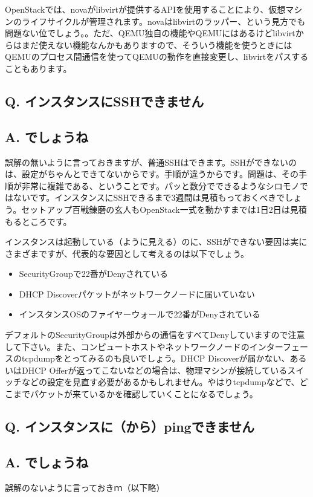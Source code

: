 \documentclass[9pt,b5paper,tombo,openany]{jsbook}
\begin{document}
OpenStackでは、novaがlibvirtが提供するAPIを使用することにより、仮想マシンのライフサイクルが管理されます。novaはlibvirtのラッパー、という見方でも問題ない位でしょう。。ただ、QEMU独自の機能やQEMUにはあるけどlibvirtからはまだ使えない機能なんかもありますので、そういう機能を使うときにはQEMUのプロセス間通信を使ってQEMUの動作を直接変更し、libvirtをパスすることもあります。

\subsection*{{\bfseries Q.} インスタンスにSSHできません}
\subsection*{{\bfseries A.} でしょうね}
誤解の無いように言っておきますが、普通SSHはできます。SSHができないのは、設定がちゃんとできてないからです。手順が違うからです。問題は、その手順が非常に複雑である、ということです。パッと数分でできるようなシロモノではないです。インスタンスにSSHできるまで3週間は見積もっておくべきでしょう。セットアップ百戦錬磨の玄人もOpenStack一式を動かすまでは1日2日は見積もるところです。

インスタンスは起動している（ように見える）のに、SSHができない要因は実にさまざまですが、代表的な要因として考えるのは以下でしょう。
\begin{itemize}
	\item SecurityGroupで22番がDenyされている
	\item DHCP Discoverパケットがネットワークノードに届いていない
	\item インスタンスOSのファイヤーウォールで22番がDenyされている
\end{itemize}
デフォルトのSecurityGroupは外部からの通信をすべてDenyしていますので注意して下さい。また、コンピュートホストやネットワークノードのインターフェースのtcpdumpをとってみるのも良いでしょう。DHCP Discoverが届かない、あるいはDHCP Offerが返ってこないなどの場合は、物理マシンが接続しているスイッチなどの設定を見直す必要があるかもしれません。やはりtcpdumpなどで、どこまでパケットが来ているかを確認していくことになるでしょう。

\subsection*{{\bfseries Q.} インスタンスに（から）pingできません}
\subsection*{{\bfseries A.} でしょうね}
誤解のないように言っておきｍ（以下略）
\end{document}
